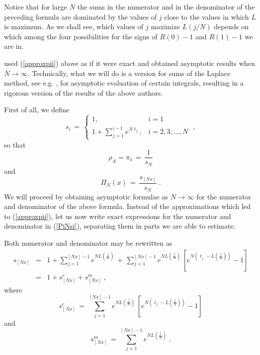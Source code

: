 \documentclass[12pt]{article}
\begin{document}
Notice that for large $N$ the sums in the numerator and in the denominator of the preceding formula are dominated by the values of $j$ close to the values in which $L$ is maximum. As we shall see, which values of $j$ maximize $L(j/N)$ depends on which among the four possibilities for the signs of $R(0)-1$ and $R(1)-1$ we are in. 

\cite{AntalScheuring} used (\ref{approxpii}) above as if it were exact and obtained asymptotic results when $N \rightarrow \infty$. Technically, what we will do is a version for sums of the Laplace method, see e.g. \cite{olver}, for asymptotic evaluation of certain integrals, resulting in a rigorous version of the results of the above authors. 

First of all, we define 
\begin{equation}
\label{defsi}
s_i \,=\, \left\{\begin{array}{ll}
1, & i=1 \\
1+ \sum_{j=1}^{i-1} e^{N \ell_j}, & i=2, 3, \dots, N 
\end{array}\;,
 \right.
\end{equation}
so that 
\begin{equation} \label{rhoA}
\rho_A = \pi_1 \,=\, \frac{1}{s_N}
\end{equation}
and
\begin{equation}
\label{PiNsi}
\Pi_N(x) \,=\, \frac{s_{[Nx]}}{s_{N}}\;.
\end{equation}
We will proceed by obtaining asymptotic formulae as $N \rightarrow \infty$ for the numerator and denominator of the above formula. Instead of the approximations which led to (\ref{approxpii}), let us now write exact expressions for the numerator and denominator in (\ref{PiNsi}), separating them in parts we are able to estimate. 

Both numerator and denominator may be rewritten as
\begin{eqnarray}
s_{[Nx]} &=& 1+ \sum_{j=1}^{[Nx]-1} e^{N L(\frac{j}{N})} \,+\, \sum_{j=1}^{[Nx]-1} e^{N L(\frac{j}{N})}\, \left[e^{N(\ell_j-L(\frac{j}{N}))}-1 \right] \label{bigexpsN}\\
&=& 1+ s_{[Nx]}^c+ s_{[Nx]}^m \nonumber\;,
\end{eqnarray}
where
\begin{equation}
\label{defsnc}
s_{[Nx]}^c \,=\, \sum_{j=1}^{[Nx]-1} e^{N L(\frac{j}{N})}\, \left[e^{N(\ell_j-L(\frac{j}{N}))}-1 \right] 
\end{equation}
and
\begin{equation} \label{defsnm}
s_{[Nx]}^m \,=\, \sum_{j=1}^{[Nx]-1} e^{N L(\frac{j}{N})} \;.
\end{equation}
\end{document}
